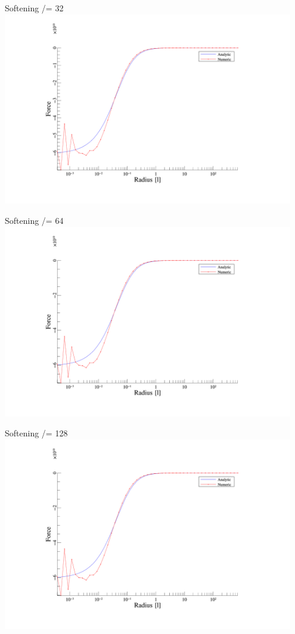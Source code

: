 \begin{frame}{Softening /= 32}
	\includegraphics[width=0.95\textwidth]{figures/plots/forces_32.png}
\end{frame}

\begin{frame}{Softening /= 64}
	\includegraphics[width=0.95\textwidth]{figures/plots/forces_64.png}
\end{frame}

\begin{frame}{Softening /= 128}
	\includegraphics[width=0.95\textwidth]{figures/plots/forces_128.png}
\end{frame}

